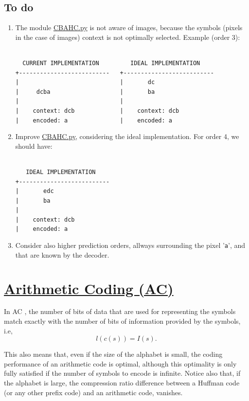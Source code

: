 \subsection*{To do}
\begin{enumerate}
\item The module
  \href{https://github.com/Sistemas-Multimedia/VCF/blob/main/src/CBAHC.py}{CBAHC.py}
  is not aware of images, because the symbols (pixels in the case of
  images) context is not optimally selected. Example (order 3):
\begin{verbatim}

  CURRENT IMPLEMENTATION         IDEAL IMPLEMENTATION
+--------------------------   +--------------------------
|                             |       dc
|     dcba                    |       ba
|                             |
|    context: dcb             |    context: dcb
|    encoded: a               |    encoded: a

\end{verbatim}
\item Improve
  \href{https://github.com/Sistemas-Multimedia/VCF/blob/main/src/CBAHC.py}{CBAHC.py},
  considering the ideal implementation. For order 4, we should have:
\begin{verbatim}

   IDEAL IMPLEMENTATION
+--------------------------
|       edc
|       ba
|
|    context: dcb
|    encoded: a

\end{verbatim}
\item Consider also higher prediction orders, allways surrounding the pixel
  '\verb|a|', and that are known by the decoder.
\end{enumerate}

\section{\href{https://en.wikipedia.org/wiki/Arithmetic_coding}{Arithmetic
    Coding (AC)}}
In AC \cite{vruiz__arithmetic_coding,ruiz2000compresion,nelson96datacompression},
the number of bits of data that are used for representing the symbols
match exactly with the number of bits of information provided by the
symbols, i.e,
\begin{equation}
  l(c(s)) = I(s).
\end{equation}

This also means that, even if the size of the alphabet is small, the
coding performance of an arithmetic code is optimal, although this
optimality is only fully satisfied if the number of symbols to encode
is infinite. Notice also that, if the alphabet is large, the
compression ratio difference between a Huffman code (or any other
prefix code) and an arithmetic code, vanishes.

